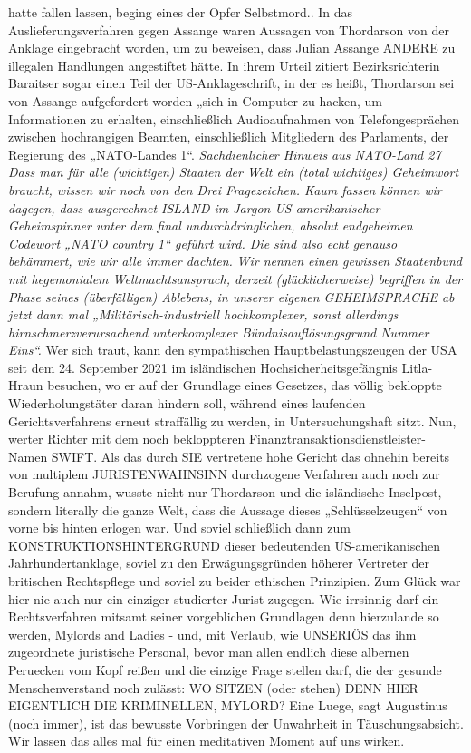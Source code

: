 \begin{multicols}{2}
{{hatte fallen lassen, beging eines der Opfer Selbstmord.}.\textCR
In das Auslieferungsverfahren gegen Assange waren
Aussagen von Thordarson von der Anklage eingebracht
worden, um zu beweisen, dass Julian Assange ANDERE zu illegalen Handlungen angestiftet hätte. In ihrem
Urteil zitiert Bezirksrichterin Baraitser sogar einen Teil
der US-Anklageschrift, in der es heißt, Thordarson sei
von Assange aufgefordert worden „sich in Computer
zu hacken, um Informationen zu erhalten, einschließlich Audioaufnahmen von Telefongesprächen zwischen
hochrangigen Beamten, einschließlich Mitgliedern des
Parlaments, der Regierung des „NATO-Landes 1“.\textCR
\textit{Sachdienlicher Hinweis aus NATO-Land 27 
Dass man für alle (wichtigen) Staaten der Welt ein (total wichtiges) Geheimwort braucht, wissen wir noch von
den Drei Fragezeichen. Kaum fassen können wir dagegen,
dass ausgerechnet ISLAND im Jargon US-amerikanischer
Geheimspinner unter dem final undurchdringlichen, absolut endgeheimen Codewort „NATO country 1“ geführt
wird. Die sind also echt genauso behämmert, wie wir alle
immer dachten.
}
\textit{
Wir nennen einen gewissen Staatenbund mit hegemonialem Weltmachtsanspruch, derzeit (glücklicherweise)
begriffen in der Phase seines (überfälligen) Ablebens, in
unserer eigenen GEHEIMSPRACHE ab jetzt dann mal
„Militärisch-industriell hochkomplexer, sonst allerdings
hirnschmerzverursachend unterkomplexer Bündnisauflösungsgrund Nummer Eins“.
}\textCR
Wer sich traut, kann den sympathischen Hauptbelastungszeugen der USA seit dem 24. September 2021 im
isländischen Hochsicherheitsgefängnis Litla-Hraun besuchen, wo er auf der Grundlage eines Gesetzes, das
völlig bekloppte Wiederholungstäter daran hindern soll,
während eines laufenden Gerichtsverfahrens erneut
straffällig zu werden, in Untersuchungshaft sitzt.\textCR
Nun, werter Richter mit dem noch bekloppteren Finanztransaktionsdienstleister-Namen SWIFT. Als das durch
SIE vertretene hohe Gericht das ohnehin bereits von
multiplem JURISTENWAHNSINN durchzogene Verfahren auch noch zur Berufung annahm, wusste nicht nur
Thordarson und die isländische Inselpost, sondern literally die ganze Welt, dass die Aussage dieses „Schlüsselzeugen“ von vorne bis hinten erlogen war.\textCR
Und soviel schließlich dann zum KONSTRUKTIONSHINTERGRUND dieser bedeutenden US-amerikanischen Jahrhundertanklage, soviel zu den Erwägungsgründen höherer Vertreter der britischen Rechtspflege
und soviel zu beider ethischen Prinzipien.\textCR
Zum Glück war hier nie auch nur ein einziger studierter Jurist zugegen. Wie irrsinnig darf ein Rechtsverfahren
mitsamt seiner vorgeblichen Grundlagen denn hierzulande so werden, Mylords and Ladies - und, mit Verlaub,
wie UNSERIÖS das ihm zugeordnete juristische Personal, bevor man allen endlich diese albernen Peruecken
vom Kopf reißen und die einzige Frage stellen darf, die
der gesunde Menschenverstand noch zulässt: WO SITZEN (oder stehen) DENN HIER EIGENTLICH DIE KRIMINELLEN, MYLORD?\textCR
Eine Luege, sagt Augustinus (noch immer), ist das bewusste Vorbringen der Unwahrheit in Täuschungsabsicht. Wir lassen das alles mal für einen meditativen Moment auf uns wirken.}



\end{multicols}
